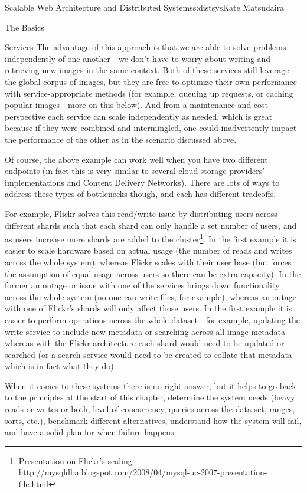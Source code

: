 \begin{aosachapter}{Scalable Web Architecture and Distributed Systems}{s:distsys}{Kate Matsudaira}
\begin{aosasect1}{The Basics}
\begin{aosasect2}{Services}
The advantage of this approach is that we are able to solve 
problems independently of one another---we don't have to worry about
writing and retrieving new images in the same context. Both of
these services still leverage the global corpus of images, but they
are free to optimize their own performance with service-appropriate
methods
(for example, queuing up requests, or caching
popular images---more on this below). And from a maintenance and cost
perspective each service can scale independently as needed, which is
great because if they were combined and intermingled, one could
inadvertently impact the performance of the other as in the scenario
discussed above.

Of course, the above example can work well when you have two different
endpoints (in fact this is very similar to several cloud storage
providers' implementations and Content Delivery Networks). There are
lots of ways to address these types of bottlenecks though, and each
has different tradeoffs.

For example, Flickr solves this read/write issue by distributing users
across different shards such that each shard can only handle a set
number of users, and as users increase more shards are added to the
cluster\footnote{Presentation on Flickr's scaling:
  \url{http://mysqldba.blogspot.com/2008/04/mysql-uc-2007-presentation-file.html}}. In
the first example it is easier to scale hardware based on actual usage
(the number of reads and writes across the whole system), whereas
Flickr scales with their user base (but forces the assumption of equal
usage across users so there can be extra capacity). In the former an
outage or issue with one of the services brings down functionality
across the whole system (no-one can write files, for example), whereas
an outage with one of Flickr's shards will only affect those users. In
the first example it is easier to perform operations across the whole
dataset---for example, updating the write service to include new
metadata or searching across all image metadata---whereas with the
Flickr architecture each shard would need to be updated or searched
(or a search service would need to be created to collate that
metadata---which is in fact what they do).

When it comes to these systems there is no right answer, but it helps
to go back to the principles at the start of this chapter, determine
the system needs (heavy reads or writes or both, level of concurrency,
queries across the data set, ranges, sorts, etc.), benchmark different
alternatives, understand how the system will fail, and have a solid plan
for when failure happens.


\end{aosasect2}
\end{aosasect1}
\end{aosachapter}
